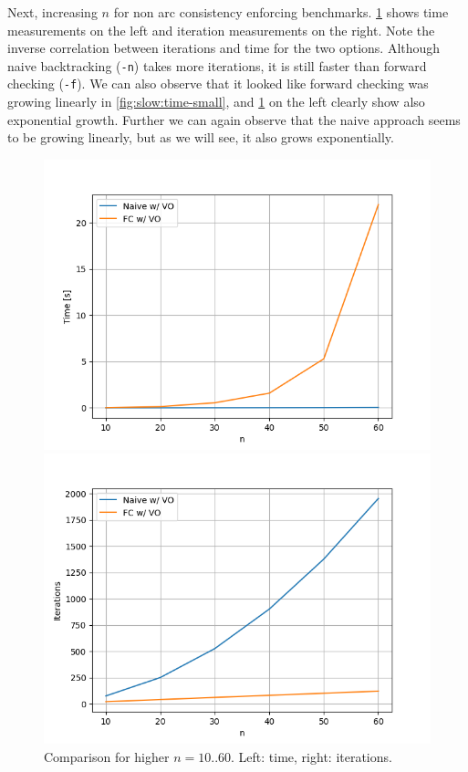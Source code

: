 Next, increasing $n$ for non arc consistency enforcing benchmarks. \cref{fig:slow:sidebyside} shows time measurements on the left and iteration measurements on the right. Note the inverse correlation between iterations and time for the two options. Although naive backtracking (\verb|-n|) takes more iterations, it is still faster than forward checking (\verb|-f|). We can also observe that it looked like forward checking was growing linearly in \cref{fig:slow:time-small}, and \cref{fig:slow:sidebyside} on the left clearly show also exponential growth. Further we can again observe that the naive approach seems to be growing linearly, but as we will see, it also grows exponentially.

\begin{figure}[ht]
	\centering
	\begin{minipage}{0.49\textwidth}
		\centering
		\includegraphics[width=\textwidth]{./Problems/slow_convergence/plots/time.png}
	\end{minipage}
	\hfill
	\begin{minipage}{0.49\textwidth}
		\centering
		\includegraphics[width=\textwidth]{./Problems/slow_convergence/plots/iterations.png}
	\end{minipage}
	\caption{Comparison for higher $n = 10..60$. Left: time, right: iterations.}
	\label{fig:slow:sidebyside}
\end{figure}

